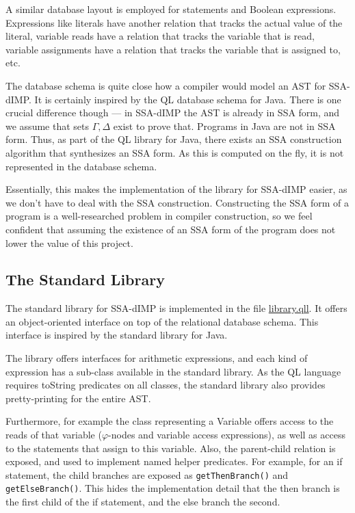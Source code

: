 A similar database layout is employed for statements and Boolean expressions.
Expressions like literals have another relation that tracks the actual value of the
literal, variable reads have a relation that tracks the variable that is read,
variable assignments have a relation that tracks the variable that is assigned to, etc.

The database schema is quite close how a compiler would model an AST for SSA-dIMP.
It is certainly inspired by the QL database schema for Java.
There is one crucial difference though --- in SSA-dIMP the AST is already in SSA form,
and we assume that sets $\Gamma, \Delta$ exist to prove that.
Programs in Java are not in SSA form.
Thus, as part of the QL library for Java, there exists an SSA construction algorithm
that synthesizes an SSA form.
As this is computed on the fly, it is not represented in the database schema.

Essentially, this makes the implementation of the library for SSA-dIMP easier,
as we don't have to deal with the SSA construction.
Constructing the SSA form of a program is a well-researched problem in compiler
construction, so we feel confident that assuming the existence of an SSA form 
of the program does not lower the value of this project.

\subsection{The Standard Library}
The standard library for SSA-dIMP is implemented in the file \hyperref[lst:library]{library.qll}.
It offers an object-oriented interface on top of the relational
database schema.
This interface is inspired by the standard library for Java.

The library offers interfaces for arithmetic expressions, and each kind of expression
has a sub-class available in the standard library.
As the QL language requires toString predicates on all classes,
the standard library also provides pretty-printing for the entire AST.

Furthermore, for example the class representing a Variable offers access to the
reads of that variable ($\varphi$-nodes and variable access expressions), as well
as access to the statements that assign to this variable.
Also, the parent-child relation is exposed, and used to implement named helper predicates.
For example, for an if statement, the child branches are exposed as \texttt{getThenBranch()}
and \texttt{getElseBranch()}.
This hides the implementation detail that the then branch is the first child of the
if statement, and the else branch the second.

